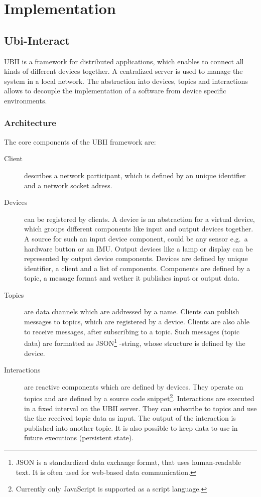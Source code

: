 \chapter{Implementation}\label{chapter:implementation}

\section{Ubi-Interact}\label{section:ubi-interact}

\ac{UBII} is a framework for distributed applications, which enables to connect all kinds of different devices together. A centralized server is used to manage the system in a local network. The abstraction into devices, topics and interactions allows to decouple the implementation of a software from device specific environments.

\subsection{Architecture}\label{subsection:architecture}

The core components of the \ac{UBII} framework are:
\begin{description}
    \item[Client] describes a network participant, which is defined by an unique identifier and a network socket adress.
    \item[Devices] can be registered by clients. A device is an abstraction for a virtual device, which groups different components like input and output devices together. A source for such an input device component, could be any sensor e.g.\ a hardware button or an \ac{IMU}. Output devices like a lamp or display can be represented by output device components.
    Devices are defined by unique identifier, a client and a list of components. Components are defined by a topic, a message format and wether it publishes input or output data.
    \item[Topics] are data channels which are addressed by a name. Clients can publish messages to topics, which are registered by a device. Clients are also able to receive messages, after subscribing to a topic. Such messages (topic data) are formatted as JSON\footnote{JSON is a standardized data exchange format, that uses human-readable text. It is often used for web-based data communication.} -string, whose structure is defined by the device.
    \item[Interactions] are reactive components which are defined by devices. They operate on topics and are defined by a source code snippet\footnote{Currently only JavaScript is supported as a script language.}. Interactions are executed in a fixed interval on the \ac{UBII} server. They can subscribe to topics and use the the received topic data as input. The output of the interaction is published into another topic. It is also possible to keep data to use in future executions (persistent state).
\end{description}



